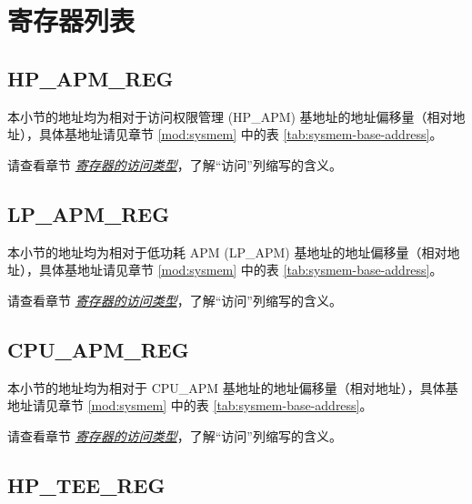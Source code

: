 \documentclass[main\_\_CN.tex]{subfiles}
\begin{document}


\hypertarget{permctrl-reg-summ}{}
\section{寄存器列表}
\label{sec:permctrl-reg-summ}

\subsection{HP\_APM\_REG}
\label{sec:permctrl-reg-hp}

本小节的地址均为相对于访问权限管理 (HP\_APM) 基地址的地址偏移量（相对地址），具体基地址请见章节 \ref{mod:sysmem} \textit{} 中的表 \ref{tab:sysmem-base-address}。

请查看章节 \hyperref[glossary-access-types]{\textit{寄存器的访问类型}}，了解“访问”列缩写的含义。



\subsection{LP\_APM\_REG}
\label{sec:permctrl-reg-lp}

本小节的地址均为相对于低功耗 APM (LP\_APM) 基地址的地址偏移量（相对地址），具体基地址请见章节 \ref{mod:sysmem} \textit{} 中的表 \ref{tab:sysmem-base-address}。

请查看章节 \hyperref[glossary-access-types]{\textit{寄存器的访问类型}}，了解“访问”列缩写的含义。




\subsection{CPU\_APM\_REG}
\label{sec:permctrl-reg-cpu}

本小节的地址均为相对于 CPU\_APM 基地址的地址偏移量（相对地址），具体基地址请见章节 \ref{mod:sysmem} \textit{} 中的表 \ref{tab:sysmem-base-address}。

请查看章节 \hyperref[glossary-access-types]{\textit{寄存器的访问类型}}，了解“访问”列缩写的含义。



\subsection{HP\_TEE\_REG}
\end{document}
